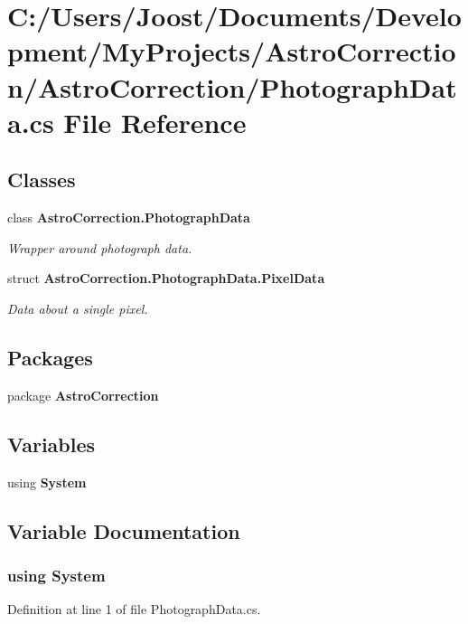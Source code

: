 \section{C:/Users/Joost/Documents/Development/MyProjects/AstroCorrection/AstroCorrection/PhotographData.cs File Reference}
\label{_photograph_data_8cs}
\subsection*{Classes}
\begin{DoxyCompactItemize}
\item 
class {\bf AstroCorrection.PhotographData}
\begin{DoxyCompactList}\small\item\em Wrapper around photograph data. \item\end{DoxyCompactList}\item 
struct {\bf AstroCorrection.PhotographData.PixelData}
\begin{DoxyCompactList}\small\item\em Data about a single pixel. \item\end{DoxyCompactList}\end{DoxyCompactItemize}
\subsection*{Packages}
\begin{DoxyCompactItemize}
\item 
package {\bf AstroCorrection}
\end{DoxyCompactItemize}
\subsection*{Variables}
\begin{DoxyCompactItemize}
\item 
﻿using {\bf System}
\end{DoxyCompactItemize}


\subsection{Variable Documentation}
\subsubsection[{System}]{\setlength{\rightskip}{0pt plus 5cm}﻿using {\bf System}}\label{_photograph_data_8cs_a81a223a02c34d82b47199f08308847f2}


Definition at line 1 of file PhotographData.cs.